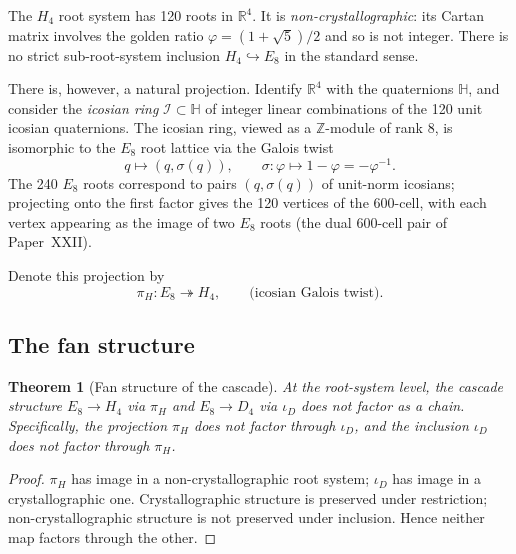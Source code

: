 \documentclass[12pt]{article}
\newtheorem{theorem}{Theorem}
\begin{document}
The $H_4$ root system has 120 roots in $\mathbb{R}^4$. It is \emph{non-crystallographic}: its Cartan matrix involves the golden ratio $\varphi = (1+\sqrt{5})/2$ and so is not integer. There is no strict sub-root-system inclusion $H_4 \hookrightarrow E_8$ in the standard sense.

There is, however, a natural projection. Identify $\mathbb{R}^4$ with the quaternions $\mathbb{H}$, and consider the \emph{icosian ring} $\mathcal{I} \subset \mathbb{H}$ of integer linear combinations of the 120 unit icosian quaternions. The icosian ring, viewed as a $\mathbb{Z}$-module of rank 8, is isomorphic to the $E_8$ root lattice via the Galois twist
\[
q \mapsto (q, \sigma(q)), \qquad \sigma: \varphi \mapsto 1 - \varphi = -\varphi^{-1}.
\]
The 240 $E_8$ roots correspond to pairs $(q, \sigma(q))$ of unit-norm icosians; projecting onto the first factor gives the 120 vertices of the 600-cell, with each vertex appearing as the image of two $E_8$ roots (the dual 600-cell pair of Paper~XXII).

Denote this projection by
\begin{equation}\label{eq:piH}
\pi_H: E_8 \twoheadrightarrow H_4, \qquad \text{(icosian Galois twist)}.
\end{equation}

\subsection{The fan structure}\label{sec:emb:fan}

\begin{theorem}[Fan structure of the cascade]\label{thm:fan}
At the root-system level, the cascade structure $E_8 \to H_4$ via $\pi_H$ and $E_8 \to D_4$ via $\iota_D$ does not factor as a chain. Specifically, the projection $\pi_H$ does not factor through $\iota_D$, and the inclusion $\iota_D$ does not factor through $\pi_H$.
\end{theorem}

\begin{proof}
$\pi_H$ has image in a non-crystallographic root system; $\iota_D$ has image in a crystallographic one. Crystallographic structure is preserved under restriction; non-crystallographic structure is not preserved under inclusion. Hence neither map factors through the other.
\end{proof}
\end{document}
